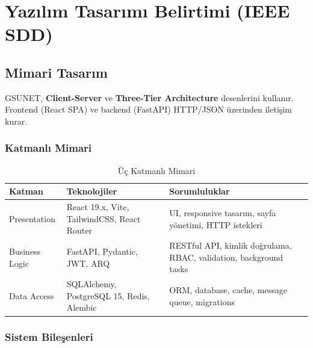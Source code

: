\documentclass[a4paper,12pt]{report}
\begin{document}
\chapter{Yazılım Tasarımı Belirtimi (IEEE SDD)}


\section{Mimari Tasarım}

GSUNET, \textbf{Client-Server} ve \textbf{Three-Tier Architecture} desenlerini kullanır. Frontend (React SPA) ve backend (FastAPI) HTTP/JSON üzerinden iletişim kurar.

\subsection{Katmanlı Mimari}

\begin{table}[h]
\centering
\small
\begin{tabular}{|p{2.8cm}|p{3.5cm}|p{6.5cm}|}
\hline
\textbf{Katman} & \textbf{Teknolojiler} & \textbf{Sorumluluklar} \\ \hline
Presentation & React 19.x, Vite, TailwindCSS, React Router & UI, responsive tasarım, sayfa yönetimi, HTTP istekleri \\ \hline
Business Logic & FastAPI, Pydantic, JWT, ARQ & RESTful API, kimlik doğrulama, RBAC, validation, background tasks \\ \hline
Data Access & SQLAlchemy, PostgreSQL 15, Redis, Alembic & ORM, database, cache, message queue, migrations \\ \hline
\end{tabular}
\caption{Üç Katmanlı Mimari}
\end{table}

\subsection{Sistem Bileşenleri}
\end{document}
